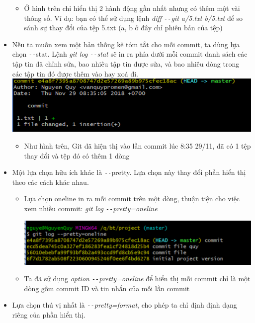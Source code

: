\documentclass[12pt,a4paper]{report}
\begin{document}
\begin{itemize}
\begin{itemize}
\item Ở hình trên chỉ hiển thị 2 hành động gần nhất nhưng có thêm một vài thông số. Ví dụ: bạn có thể sử dụng lệnh {\it diff \texttt{-{}-}git a/5.txt b/5.txt} để so sánh sự thay đổi của tệp 5.txt (a, b ở đây chỉ phiên bản của tệp)\vskip 0.4cm
\end{itemize}
\item Nếu ta muốn xem một bản thống kê tóm tắt cho mỗi commit, ta dùng lựa chọn \texttt{-{}-}stat. Lệnh {\it git log \texttt{-{}-}stat} sẽ in ra phía dưới mỗi commit danh sách các tập tin đã chỉnh sửa, bao nhiêu tập tin được sửa, và bao nhiêu dòng trong các tập tin đó được thêm vào hay xoá đi.
	\includegraphics[width=0.8\linewidth]{screenshot019}

	\label{fig:screenshot019}
\begin{itemize}
\item Như hình trên, Git đã hiện thị vào lần commit lúc 8:35 29/11, đã có 1 tệp thay đổi và tệp đó có thêm 1 dòng
\end{itemize}
\item Một lựa chọn hữu ích khác là \texttt{-{}-}pretty. Lựa chọn này thay đổi phần hiển thị theo các cách khác nhau.
\begin{itemize}
\item Lựa chọn oneline in ra mỗi commit trên một dòng, thuận tiện cho việc xem nhiều commit: {\it git log \texttt{-{}-}pretty=oneline}

	\includegraphics[width=0.8\linewidth]{screenshot020}
	
	\label{fig:screenshot020}

\item Ta đã sử dụng {\it option \texttt{-{}-}pretty=oneline} để hiển thị mỗi commit chỉ là một dòng gồm commit ID và tin nhắn của mỗi lần commit
\end{itemize}
\item Lựa chọn thú vị nhất là {\it \texttt{-{}-}pretty=format}, cho phép ta chỉ định định dạng riêng của phần hiển thị.


\end{itemize}
\end{document}

